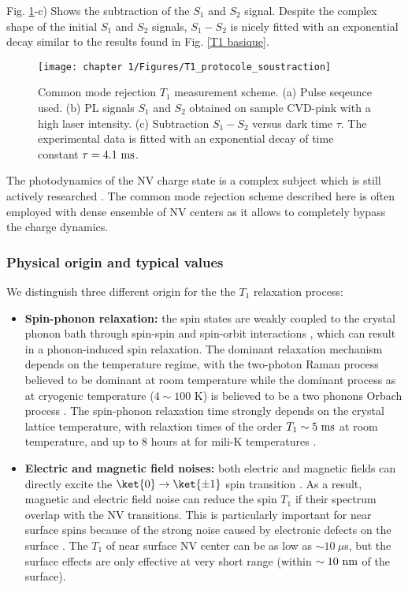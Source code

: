 \documentclass[a4paper,11pt]{report}
\begin{document}
\begin{refsection}
Fig. \ref{T1 soustraction}-c) Shows the subtraction of the $S_1$ and $S_2$ signal. Despite the complex shape of the initial $S_1$ and $S_2$ signals, $S_1-S_2$ is nicely fitted with an exponential decay similar to the results found in Fig. \ref{T1 basique}.

\begin{figure}[h!]
\centering
\texttt{[image: chapter 1/Figures/T1\_protocole\_soustraction]}
\caption{Common mode rejection $T_1$ measurement scheme. (a) Pulse seqeunce used. (b) PL signals $S_1$ and $S_2$ obtained on sample CVD-pink with a high laser intensity. (c) Subtraction $S_1-S_2$ versus dark time $\tau$. The experimental data is fitted with an exponential decay of time constant $\tau=4.1\ \rm ms$.}
\label{T1 soustraction}
\end{figure}

The photodynamics of the NV charge state is a complex subject which is still actively researched \citep{craik2020microwave, gorrini2021long}. The common mode rejection scheme described  here is often employed with dense ensemble of NV centers \citep{jarmola2012temperature, mrozek2015longitudinal, choi2017depolarization} as it allows to completely bypass the charge dynamics.

\subsubsection{Physical origin and typical values}

We distinguish three different origin for the the $T_1$ relaxation process:
\begin{itemize}
\item \textbf{Spin-phonon relaxation:} the spin states are weakly coupled to the crystal phonon bath through spin-spin and spin-orbit interactions \citep{norambuena2018spin}, which can result in a phonon-induced spin relaxation. The dominant relaxation mechanism depends on the  temperature regime, with the two-photon Raman process believed to be dominant at room temperature \citep{takahashi2008quenching, jarmola2012temperature} while the dominant process as at cryogenic temperature ($4\sim100$ K) is believed to be a two phonons Orbach process \citep{redman1991spin, norambuena2018spin}. The spin-phonon relaxation time strongly depends on the crystal lattice temperature, with relaxtion times of the order $T_1 \sim 5\ \rm ms$ at room temperature, and up to 8 hours at for mili-K temperatures \citep{astner2018solid}.

\item \textbf{Electric and magnetic field noises:} both electric and magnetic fields can directly excite the $\ket{0} \to \ket{\pm 1}$ spin transition \citep{udvarhelyi2018spin}. As a result, magnetic and electric field noise can reduce the spin $T_1$ if their spectrum overlap with the NV transitions. This is particularly important for near surface spins because of the strong noise caused by electronic defects on the surface \citep{sangtawesin2019origins}. The $T_1$ of near surface NV center can be as low as $\sim 10\ \mu$s, but the surface effects are only effective at very short range (within $\sim 10\ \rm nm$ of the surface).


\end{itemize}
\end{refsection}
\end{document}
